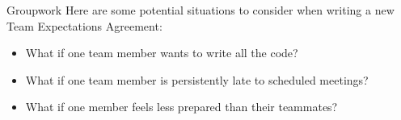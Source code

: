 \documentclass{beamer}
\begin{document}
    \begin{frame}{Groupwork}
        Here are some potential situations to consider when writing a new Team Expectations Agreement:
        \begin{itemize}
            \item What if one team member wants to write all the code?
            \item What if one team member is persistently late to scheduled meetings?
            \item What if one member feels less prepared than their teammates?
        \end{itemize}
    \end{frame}
\end{document}
